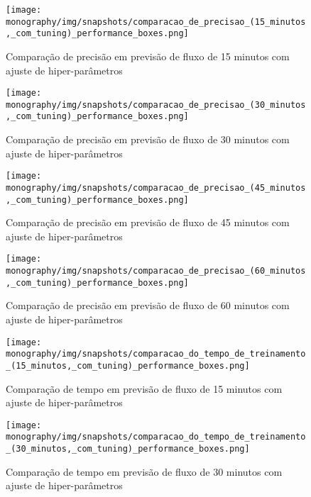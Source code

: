 \begin{figure}[htbp]
    \centering
    \texttt{[image: monography/img/snapshots/comparacao\_de\_precisao\_(15\_minutos,\_com\_tuning)\_performance\_boxes.png]}
    \label{figure:comparacao_previsao_precisao_15_com_tuning}
    \caption{Comparação de precisão em previsão de fluxo de 15 minutos com ajuste de hiper-parâmetros}
\end{figure}

\begin{figure}[htbp]
    \centering
    \texttt{[image: monography/img/snapshots/comparacao\_de\_precisao\_(30\_minutos,\_com\_tuning)\_performance\_boxes.png]}
    \label{figure:comparacao_previsao_precisao_30_com_tuning}
    \caption{Comparação de precisão em previsão de fluxo de 30 minutos com ajuste de hiper-parâmetros}
\end{figure}

\begin{figure}[htbp]
    \centering
    \texttt{[image: monography/img/snapshots/comparacao\_de\_precisao\_(45\_minutos,\_com\_tuning)\_performance\_boxes.png]}
    \label{figure:comparacao_previsao_precisao_45_com_tuning}
    \caption{Comparação de precisão em previsão de fluxo de 45 minutos com ajuste de hiper-parâmetros}
\end{figure}

\begin{figure}[htbp]
    \centering
    \texttt{[image: monography/img/snapshots/comparacao\_de\_precisao\_(60\_minutos,\_com\_tuning)\_performance\_boxes.png]}
    \label{figure:comparacao_previsao_precisao_60_com_tuning}
    \caption{Comparação de precisão em previsão de fluxo de 60 minutos com ajuste de hiper-parâmetros}
\end{figure}

\begin{figure}[htbp]
    \centering
    \texttt{[image: monography/img/snapshots/comparacao\_do\_tempo\_de\_treinamento\_(15\_minutos,\_com\_tuning)\_performance\_boxes.png]}
    \label{figure:comparacao_previsao_tempo_15_com_tuning}
    \caption{Comparação de tempo em previsão de fluxo de 15 minutos com ajuste de hiper-parâmetros}
\end{figure}

\begin{figure}[htbp]
    \centering
    \texttt{[image: monography/img/snapshots/comparacao\_do\_tempo\_de\_treinamento\_(30\_minutos,\_com\_tuning)\_performance\_boxes.png]}
    \label{figure:comparacao_previsao_tempo_30_com_tuning}
    \caption{Comparação de tempo em previsão de fluxo de 30 minutos com ajuste de hiper-parâmetros}
\end{figure}

